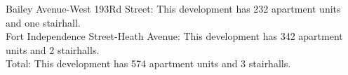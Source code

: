 {Bailey Avenue-West 193Rd Street}: This development has 232 apartment units and one stairhall.\\{Fort Independence Street-Heath Avenue}: This development has 342 apartment units and 2 stairhalls.\\{Total}: This development has 574 apartment units and 3 stairhalls.\\